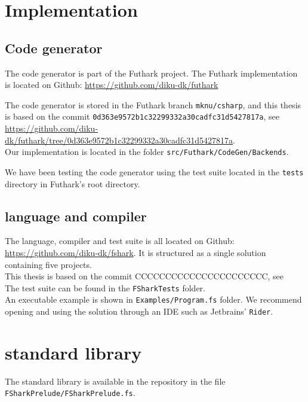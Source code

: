 \begin{appendices}
\chapter{Implementation}
\section{Code generator}
The \csharp{} code generator is part of the Futhark project.
The Futhark implementation is located on Github:
\url{https://github.com/diku-dk/futhark}

The code generator is stored in the Futhark branch \texttt{mknu/csharp}, and
this thesis is based
on the commit \texttt{0d363e9572b1c32299332a30cadfc31d5427817a}, see\\
\url{https://github.com/diku-dk/futhark/tree/0d363e9572b1c32299332a30cadfc31d5427817a}.\\
Our implementation is located in the folder
\texttt{src/Futhark/CodeGen/Backends}.

We have been testing the code generator using the test suite located in the 
\texttt{tests} directory in Futhark's root directory.

\section{\fshark{} language and compiler}
The \fshark{} language, compiler and test suite is all located on Github:\\
\url{https://github.com/diku-dk/fshark}. It is structured as a single \fsharp{}
solution containing five \fsharp{} projects.\\
This thesis is based on the commit CCCCCCCCCCCCCCCCCCCCCC, see\\

The \fshark{} test suite can be found in the \texttt{FSharkTests} folder.\\
An executable example is shown in \texttt{Examples/Program.fs} folder.
We recommend opening and using the \fshark{} solution through an IDE such as
Jetbrains' \texttt{Rider}.

\chapter{\fshark{} standard library}
\label{appendix:soacs}
The \fshark{} standard library is available in the \fshark{} repository in the file \texttt{FSharkPrelude/FSharkPrelude.fs}.


\end{appendices}
